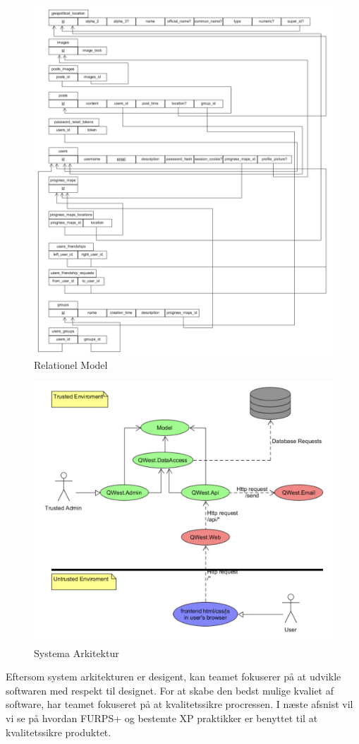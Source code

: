  
\begin{figure}
    \includegraphics[width=\linewidth]{figures/RelationelmModel.png}
    \caption{Relationel Model}
    \label{fif:Rela}
\end{figure}



\begin{figure}
    \includegraphics[width=\linewidth]{figures/Systemarkitektur.png}
    \caption{Systema Arkitektur}
    \label{fig:Arki}
\end{figure}


Eftersom system arkitekturen er desigent, kan teamet fokuserer på at udvikle softwaren med respekt til designet. For at skabe den bedst mulige kvaliet af software, har teamet fokuseret på at kvalitetssikre procressen. I næste afsnist vil vi se på hvordan FURPS+ og bestemte XP praktikker er benyttet til at kvalitetssikre produktet. 